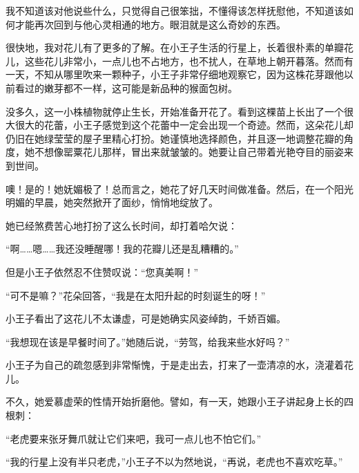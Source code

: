 我不知道该对他说些什么，只觉得自己很笨拙，不懂得该怎样抚慰他，不知道该如何才能再次回到与他心灵相通的地方。眼泪就是这么奇妙的东西。

{\startalignment[center]
 \stopalignment}


\stoptitle

\starttitle[title={8}]

很快地，我对花儿有了更多的了解。在小王子生活的行星上，长着很朴素的单瓣花儿，这些花儿非常小，一点儿也不占地方，也不扰人，在草地上朝开暮落。然而有一天，不知从哪里吹来一颗种子，小王子非常仔细地观察它，因为这株花芽跟他以前看过的嫩芽都不一样，这可能是新品种的猴面包树。

没多久，这一小株植物就停止生长，开始准备开花了。看到这棵苗上长出了一个很大很大的花蕾，小王子感觉到这个花蕾中一定会出现一个奇迹。然而，这朵花儿却仍旧在她绿莹莹的屋子里精心打扮。她谨慎地选择颜色，并且逐一地调整花瓣的角度，她不想像罂粟花儿那样，冒出来就皱皱的。她要让自己带着光艳夺目的丽姿来到世间。

噢！是的！她妩媚极了！总而言之，她花了好几天时间做准备。然后，在一个阳光明媚的早晨，她突然掀开了面纱，悄悄地绽放了。

她已经煞费苦心地打扮了这么长时间，却打着哈欠说：

“啊\ldots{}\ldots{}嗯\ldots{}\ldots{}我还没睡醒哪！我的花瓣儿还是乱糟糟的。”

但是小王子依然忍不住赞叹说：“您真美啊！”

“可不是嘛？”花朵回答，“我是在太阳升起的时刻诞生的呀！”

小王子看出了这花儿不太谦虚，可是她确实风姿绰韵，千娇百媚。

“我想现在该是早餐时间了。”她随后说，“劳驾，给我来些水好吗？”

小王子为自己的疏忽感到非常惭愧，于是走出去，打来了一壶清凉的水，浇灌着花儿。

不久，她爱慕虚荣的性情开始折磨他。譬如，有一天，她跟小王子讲起身上长的四根刺：

{\startalignment[center]
 \stopalignment}

“老虎要来张牙舞爪就让它们来吧，我可一点儿也不怕它们。”

“我的行星上没有半只老虎，”小王子不以为然地说，“再说，老虎也不喜欢吃草。”


